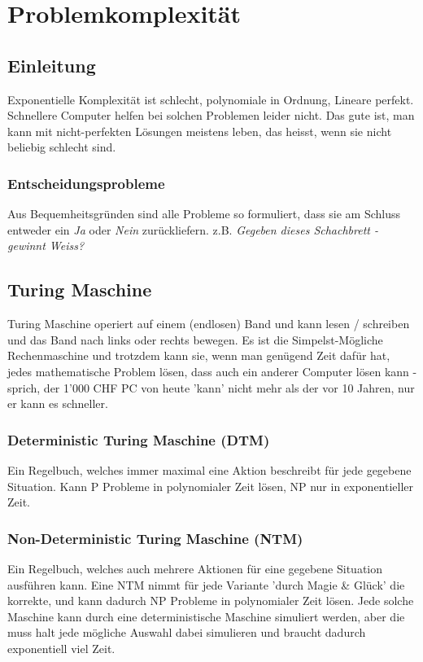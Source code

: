\chapter{Problemkomplexität}
\section{Einleitung}
Exponentielle Komplexität ist schlecht, polynomiale in Ordnung, Lineare perfekt. Schnellere Computer helfen bei solchen Problemen leider nicht. Das gute ist, man kann mit nicht-perfekten Lösungen meistens leben, das heisst, wenn sie nicht beliebig schlecht sind.
\subsection{Entscheidungsprobleme}
Aus Bequemheitsgründen sind alle Probleme so formuliert, dass sie am Schluss entweder ein \textit{Ja} oder \textit{Nein} zurückliefern. z.B. \textit{Gegeben dieses Schachbrett - gewinnt Weiss?}
\section{Turing Maschine}
Turing Maschine operiert auf einem (endlosen) Band und kann lesen / schreiben und das Band nach links oder rechts bewegen. Es ist die Simpelst-Mögliche Rechenmaschine und trotzdem kann sie, wenn man genügend Zeit dafür hat, jedes mathematische Problem lösen, dass auch ein anderer Computer lösen kann - sprich, der 1'000 CHF PC von heute 'kann' nicht mehr als der vor 10 Jahren, nur er kann es schneller.

\subsection{Deterministic Turing Maschine (DTM)}
Ein Regelbuch, welches immer maximal eine Aktion beschreibt für jede gegebene Situation. Kann P Probleme in polynomialer Zeit lösen, NP nur in exponentieller Zeit.
\subsection{Non-Deterministic Turing Maschine (NTM)}\label{sec:ntm}
Ein Regelbuch, welches auch mehrere Aktionen für eine gegebene Situation ausführen kann. Eine NTM nimmt für jede Variante 'durch Magie \& Glück' die korrekte, und kann dadurch NP Probleme in polynomialer Zeit lösen. Jede solche Maschine kann durch eine deterministische Maschine simuliert werden, aber die muss halt jede mögliche Auswahl dabei simulieren und braucht dadurch exponentiell viel Zeit.
 
